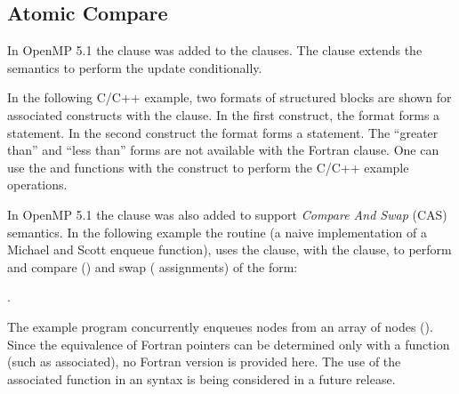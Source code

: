 \begin{ccppspecific}[4ex]
\section{Atomic Compare}
\label{sec:cas}


In OpenMP 5.1 the  clause was added to the  clauses.
The  clause extends the semantics to perform the 
update conditionally. 

In the following C/C++ example, two formats of structured blocks
are shown for associated  constructs with the  clause.
In the first  construct, the format forms a  statement.
In the second  construct the format forms a  statement.
The ``greater than'' and ``less than'' forms are not available with the Fortran 
clause.  One can use the  and  functions with the 
construct to perform the C/C++ example operations.


In OpenMP 5.1 the  clause was also added to support \emph{Compare And
Swap} (CAS) semantics. In the following example the  routine
(a naive implementation of a Michael and Scott enqueue function), uses the
 clause, with the  clause, to perform and compare
() and swap ( assignments) of the
form: 
\begin{description}[noitemsep,labelindent=5mm,widest=f90]
\item {}.
\end{description}
The example program concurrently enqueues nodes from an array of nodes ().
Since the equivalence of Fortran pointers can be determined only with a function (such as associated),
no Fortran version is provided here. The use of the associated function in an  syntax is
being considered in a future release.

\end{ccppspecific}
